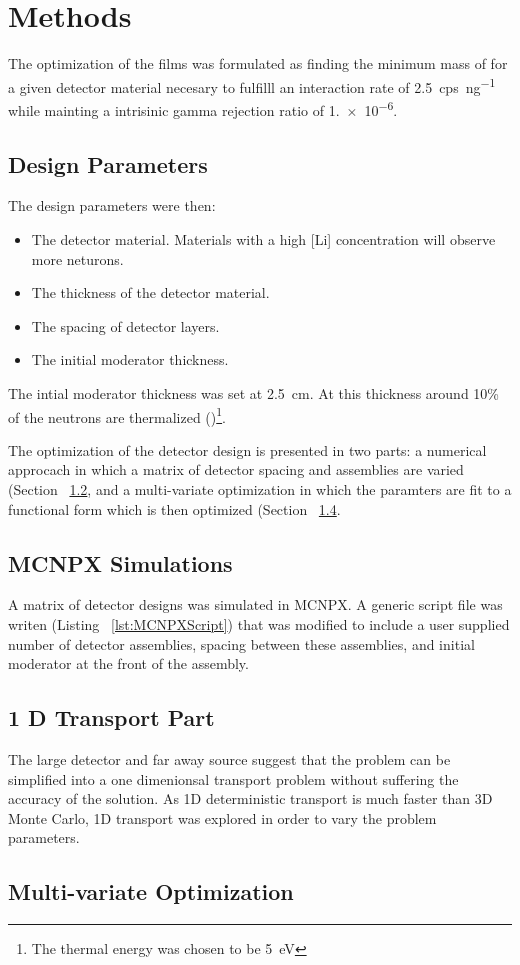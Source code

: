 \section{Methods}
\label{sec:Methodes}


The optimization of the films was formulated as finding the minimum mass of  for a given detector material necesary to fulfilll an interaction rate of \SI{2.5}{cps\per\nano\gram{}} while mainting a intrisinic gamma rejection ratio of \num{1.e-6}.

\subsection{Design Parameters}
\label{sec:DesignParameters}
The design parameters were then:
\begin{itemize}
  \item The detector material. Materials with a high [Li] concentration will observe more neturons.
  \item The thickness of the detector material.
  \item The spacing of detector layers.
  \item The initial moderator thickness.
\end{itemize}

The intial moderator thickness was set at \SI{2.5}{\centi \meter}.
At this thickness around 10\% of the neutrons are thermalized ()\footnote{The thermal energy was chosen to be \SI{5}{\electronvolt}}.

The optimization of the detector design is presented in two parts: a numerical approcach in which a matrix of detector spacing and assemblies are varied (Section ~\ref{sec:MCNPXMethods}, and a multi-variate optimization in which the paramters are fit to a functional form which is then optimized (Section ~\ref{sec:MVOptimization}.
\subsection{MCNPX Simulations}
\label{sec:MCNPXMethods}
A matrix of detector designs was simulated in MCNPX.
A generic script file was writen (Listing ~\ref{lst:MCNPXScript}) that was modified to include a user supplied number of detector assemblies, spacing between these assemblies, and initial moderator at the front of the assembly.


\subsection{1 D Transport Part}
The large detector and far away source suggest that the problem can be simplified into a one dimenionsal transport problem without suffering the accuracy of the solution.
As 1D deterministic transport is much faster than 3D Monte Carlo, 1D transport was explored in order to vary the problem parameters.

\subsection{Multi-variate Optimization}
\label{sec:MVOptimization}
